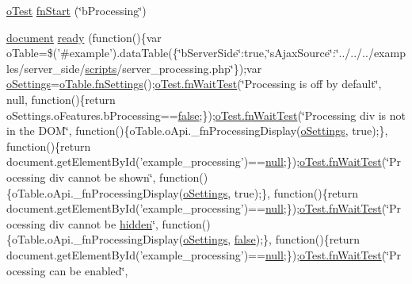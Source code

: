 \begin{DoxyCompactItemize}
\item 
\hyperlink{unit__test_8js_a3b2d259e2df3b6860d9047a92d09d0d6}{o\+Test} \hyperlink{4__server-side_2b_processing_8js_a5e47f183ac632aafd14cf5a8df46e368}{fn\+Start} (\char`\"{}b\+Processing\char`\"{})
\item 
\hyperlink{outside_events_8js_aa14f8e0338cced6720590fd2ea13bd4b}{document} \hyperlink{4__server-side_2b_processing_8js_a3f0eba012731b1774df3f0aca31dd041}{ready} (function()\{var o\+Table=\$('\#example').data\+Table(\{\char`\"{}b\+Server\+Side\char`\"{}\+:true,\char`\"{}s\+Ajax\+Source\char`\"{}\+:\char`\"{}../../../examples/server\+\_\+side/\hyperlink{tinymce_8jquery_8dev_8js_a09066d4d580eeec222f858d588b4cdef}{scripts}/server\+\_\+processing.\+php\char`\"{}\});var \hyperlink{model_8settings_8js_a4857b9c813b4dea010668e9555d0aca7}{o\+Settings}=\hyperlink{api_8methods_8js_a78f387fab92a85c2cb7830bc5d8a6141}{o\+Table.\+fn\+Settings}();\hyperlink{onhold_24__server-side_2__zero__config_8js_ab25c4d596771c0133cdc45178ce72c3d}{o\+Test.\+fn\+Wait\+Test}(\char`\"{}Processing is off by default\char`\"{}, null, function()\{return o\+Settings.\+o\+Features.\+b\+Processing==\hyperlink{validate_8js_a5df37b7f02e5cdc7d9412b7f872b8e01}{false};\});\hyperlink{onhold_24__server-side_2__zero__config_8js_ab25c4d596771c0133cdc45178ce72c3d}{o\+Test.\+fn\+Wait\+Test}(\char`\"{}Processing div is not in the D\+O\+M\char`\"{}, function()\{o\+Table.\+o\+Api.\+\_\+fn\+Processing\+Display(\hyperlink{model_8settings_8js_a4857b9c813b4dea010668e9555d0aca7}{o\+Settings}, true);\}, function()\{return document.\+get\+Element\+By\+Id('example\+\_\+processing')==\hyperlink{validate_8js_afb8e110345c45e74478894341ab6b28e}{null};\});\hyperlink{onhold_24__server-side_2__zero__config_8js_ab25c4d596771c0133cdc45178ce72c3d}{o\+Test.\+fn\+Wait\+Test}(\char`\"{}Processing div cannot be shown\char`\"{}, function()\{o\+Table.\+o\+Api.\+\_\+fn\+Processing\+Display(\hyperlink{model_8settings_8js_a4857b9c813b4dea010668e9555d0aca7}{o\+Settings}, true);\}, function()\{return document.\+get\+Element\+By\+Id('example\+\_\+processing')==\hyperlink{validate_8js_afb8e110345c45e74478894341ab6b28e}{null};\});\hyperlink{onhold_24__server-side_2__zero__config_8js_ab25c4d596771c0133cdc45178ce72c3d}{o\+Test.\+fn\+Wait\+Test}(\char`\"{}Processing div cannot be \hyperlink{media_2js_2jquery_8js_a6d83a3278d86577a50e8a86937570a90}{hidden}\char`\"{}, function()\{o\+Table.\+o\+Api.\+\_\+fn\+Processing\+Display(\hyperlink{model_8settings_8js_a4857b9c813b4dea010668e9555d0aca7}{o\+Settings}, \hyperlink{validate_8js_a5df37b7f02e5cdc7d9412b7f872b8e01}{false});\}, function()\{return document.\+get\+Element\+By\+Id('example\+\_\+processing')==\hyperlink{validate_8js_afb8e110345c45e74478894341ab6b28e}{null};\});\hyperlink{onhold_24__server-side_2__zero__config_8js_ab25c4d596771c0133cdc45178ce72c3d}{o\+Test.\+fn\+Wait\+Test}(\char`\"{}Processing can be enabled\char`\"{}, 
\end{DoxyCompactItemize}
